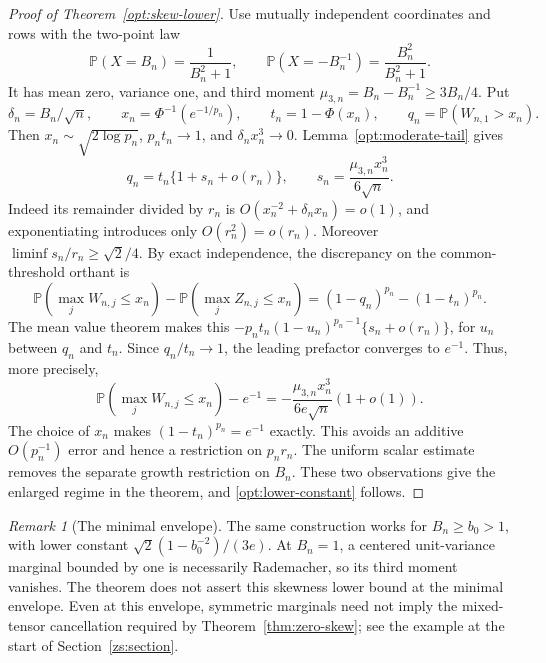 \documentclass[11pt,a4paper]{article}
\theoremstyle{remark}
\newtheorem{remark}{Remark}
\newcommand{\Pp}{\mathbb P}
\begin{document}
\begin{proof}[Proof of Theorem~\ref{opt:skew-lower}]
Use mutually independent coordinates and rows with the two-point law
\begin{equation}
 \Pp(X=B_n)=\frac1{B_n^2+1},\qquad
 \Pp(X=-B_n^{-1})=\frac{B_n^2}{B_n^2+1}.
 \label{opt:two-point-law}
\end{equation}
It has mean zero, variance one, and third moment
\(\mu_{3,n}=B_n-B_n^{-1}\ge3B_n/4\). Put
\[
 \delta_n=B_n/\sqrt n,\qquad
 x_n=\Phi^{-1}(e^{-1/p_n}),\qquad
 t_n=1-\Phi(x_n),\qquad q_n=\Pp(W_{n,1}>x_n).
\]
Then \(x_n\sim\sqrt{2\log p_n}\), \(p_nt_n\to1\), and
\(\delta_nx_n^3\to0\). Lemma~\ref{opt:moderate-tail} gives
\begin{equation}
 q_n=t_n\{1+s_n+o(r_n)\},\qquad
 s_n=\frac{\mu_{3,n}x_n^3}{6\sqrt n}.
 \label{opt:tail-linearization}
\end{equation}
Indeed its remainder divided by \(r_n\) is
\(O(x_n^{-2}+\delta_nx_n)=o(1)\), and exponentiating introduces only
\(O(r_n^2)=o(r_n)\). Moreover
\(\liminf s_n/r_n\ge\sqrt2/4\).
By exact independence, the discrepancy on the common-threshold orthant is
\[
 \Pp(\max_jW_{n,j}\le x_n)-\Pp(\max_jZ_{n,j}\le x_n)
 =(1-q_n)^{p_n}-(1-t_n)^{p_n}.
\]
The mean value theorem makes this
\(-p_nt_n(1-u_n)^{p_n-1}\{s_n+o(r_n)\}\), for \(u_n\) between
\(q_n\) and \(t_n\). Since \(q_n/t_n\to1\), the leading prefactor
converges to \(e^{-1}\). Thus, more precisely,
\begin{equation}
 \Pp(\max_jW_{n,j}\le x_n)-e^{-1}
 =-\frac{\mu_{3,n}x_n^3}{6e\sqrt n}(1+o(1)).
 \label{opt:exact-product-asymptotic}
\end{equation}
The choice of \(x_n\) makes \((1-t_n)^{p_n}=e^{-1}\) exactly.
This avoids an additive \(O(p_n^{-1})\) error and hence a restriction
on \(p_nr_n\). The uniform scalar estimate removes the separate growth
restriction on \(B_n\). These two observations give the enlarged regime
in the theorem, and \eqref{opt:lower-constant} follows.
\end{proof}

\begin{remark}[The minimal envelope]
\label{opt:envelope-one}
The same construction works for \(B_n\ge b_0>1\), with lower constant
\(\sqrt2(1-b_0^{-2})/(3e)\). At \(B_n=1\), a centered unit-variance
marginal bounded by one is necessarily Rademacher, so its third moment
vanishes. The theorem does not assert this skewness lower bound at the
minimal envelope. Even at this envelope, symmetric marginals need not
imply the mixed-tensor cancellation required by Theorem~\ref{thm:zero-skew}; see
the example at the start of Section~\ref{zs:section}.
\end{remark}
\end{document}
